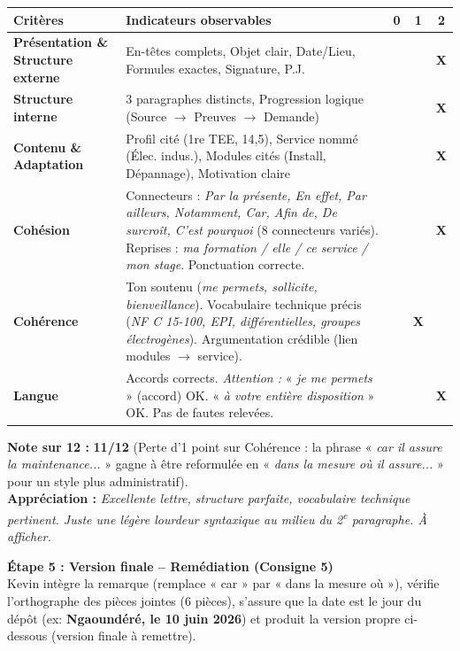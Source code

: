 \documentclass[11pt]{article}
\begin{document}
\begin{exoresolu}
\begin{center}
\begin{tabularx}{\linewidth}{|l|X|c|c|c|}\hline
\rowcolor{popblueL} \textbf{Critères} & \textbf{Indicateurs observables} & \textbf{0} & \textbf{1} & \textbf{2} \\ \hline
\textbf{Présentation \& Structure externe} & En-têtes complets, Objet clair, Date/Lieu, Formules exactes, Signature, P.J. & & & \cellcolor{popgreenL}\textbf{X} \\ \hline
\textbf{Structure interne} & 3 paragraphes distincts, Progression logique (Source $\rightarrow$ Preuves $\rightarrow$ Demande) & & & \cellcolor{popgreenL}\textbf{X} \\ \hline
\textbf{Contenu \& Adaptation} & Profil cité (1re TEE, 14,5), Service nommé (Élec. indus.), Modules cités (Install, Dépannage), Motivation claire & & & \cellcolor{popgreenL}\textbf{X} \\ \hline
\textbf{Cohésion} & Connecteurs : \textit{Par la présente, En effet, Par ailleurs, Notamment, Car, Afin de, De surcroît, C'est pourquoi} (8 connecteurs variés). Reprises : \textit{ma formation / elle / ce service / mon stage}. Ponctuation correcte. & & & \cellcolor{popgreenL}\textbf{X} \\ \hline
\textbf{Cohérence} & Ton soutenu (\textit{me permets, sollicite, bienveillance}). Vocabulaire technique précis (\textit{NF C 15-100, EPI, différentielles, groupes électrogènes}). Argumentation crédible (lien modules $\rightarrow$ service). & & \cellcolor{poporangeL}\textbf{X} & \\ \hline
\textbf{Langue} & Accords corrects. \textit{Attention :} « \textit{je me permets} » (accord) OK. « \textit{à votre entière disposition} » OK. Pas de fautes relevées. & & & \cellcolor{popgreenL}\textbf{X} \\ \hline
\end{tabularx}
\end{center}
\noindent \textbf{Note sur 12 :} \textbf{11/12} (Perte d'1 point sur Cohérence : la phrase « \textit{car il assure la maintenance...} » gagne à être reformulée en « \textit{dans la mesure où il assure...} » pour un style plus administratif). \\
\textbf{Appréciation :} \textit{Excellente lettre, structure parfaite, vocabulaire technique pertinent. Juste une légère lourdeur syntaxique au milieu du 2\textsuperscript{e} paragraphe. À afficher.}

\textbf{Étape 5 : Version finale -- Remédiation (Consigne 5)} \\
\noindent Kevin intègre la remarque (remplace « car » par « dans la mesure où »), vérifie l'orthographe des pièces jointes (6 pièces), s'assure que la date est le jour du dépôt (ex: \textbf{Ngaoundéré, le 10 juin 2026}) et produit la version propre ci-dessous (version finale à remettre).


\end{exoresolu}
\end{document}
